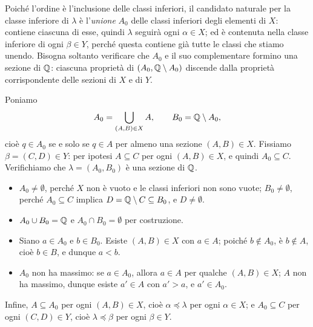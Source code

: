 \begin{schema}
\end{schema}

\begin{strategia}
Poiché l'ordine è l'inclusione delle classi inferiori, il candidato naturale per la classe
inferiore di $\lambda$ è l'\emph{unione} $A_{0}$ delle classi inferiori degli elementi
di $X$: contiene ciascuna di esse, quindi $\lambda$ seguirà ogni $\alpha\in X$; ed è
contenuta nella classe inferiore di ogni $\beta\in Y$, perché questa contiene già tutte
le classi che stiamo unendo. Bisogna soltanto verificare che $A_{0}$ e il suo
complementare formino una sezione di $\mathbb{Q}$: ciascuna proprietà di $(A_{0},\mathbb{Q}\setminus
A_{0})$ discende dalla proprietà corrispondente delle sezioni di $X$ e di $Y$.
\end{strategia}

\begin{dimostrazione}
Poniamo
\[
  A_{0}=\bigcup_{(A,B)\in X} A, \qquad B_{0}=\mathbb{Q}\setminus A_{0},
\]
cioè $q\in A_{0}$ se e solo se $q\in A$ per almeno una sezione $(A,B)\in X$. Fissiamo
$\beta=(C,D)\in Y$: per ipotesi $A\subseteq C$ per ogni $(A,B)\in X$, e quindi
$A_{0}\subseteq C$. Verifichiamo che $\lambda=(A_{0},B_{0})$ è una sezione di $\mathbb{Q}$.
\begin{itemize}
  \item $A_{0}\neq\emptyset$, perché $X$ non è vuoto e le classi inferiori non sono vuote;
  $B_{0}\neq\emptyset$, perché $A_{0}\subseteq C$ implica $D=\mathbb{Q}\setminus C\subseteq
  B_{0}$, e $D\neq\emptyset$.
  \item $A_{0}\cup B_{0}=\mathbb{Q}$ e $A_{0}\cap B_{0}=\emptyset$ per costruzione.
  \item Siano $a\in A_{0}$ e $b\in B_{0}$. Esiste $(A,B)\in X$ con $a\in A$; poiché
  $b\notin A_{0}$, è $b\notin A$, cioè $b\in B$, e dunque $a<b$.
  \item $A_{0}$ non ha massimo: se $a\in A_{0}$, allora $a\in A$ per qualche $(A,B)\in
  X$; $A$ non ha massimo, dunque esiste $a'\in A$ con $a'>a$, e $a'\in A_{0}$.
\end{itemize}
Infine, $A\subseteq A_{0}$ per ogni $(A,B)\in X$, cioè $\alpha\preceq\lambda$ per ogni
$\alpha\in X$; e $A_{0}\subseteq C$ per ogni $(C,D)\in Y$, cioè $\lambda\preceq\beta$ per
ogni $\beta\in Y$.
\end{dimostrazione}

